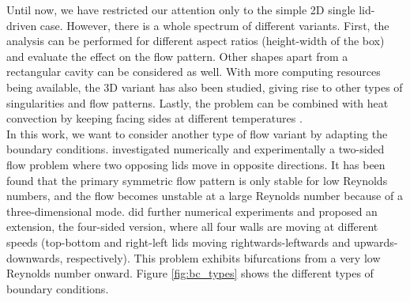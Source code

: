 Until now, we have restricted our attention only to the simple 2D single
lid-driven case. However, there is a whole spectrum of different variants.
First, the analysis can be performed for different aspect ratios (height-width
of the box) and evaluate the effect on the flow pattern. Other shapes apart
from a rectangular cavity can be considered as well. With more computing
resources being available, the 3D variant has also been studied, giving rise to
other types of singularities and flow patterns. Lastly, the problem can be
combined with heat convection by keeping facing sides at different
temperatures \citep{}. \\

In this work, we want to consider another type of flow variant by adapting the
boundary conditions. \cite{kuhlmann1997} investigated numerically and
experimentally a two-sided flow problem where two opposing lids move in
opposite directions. It has been found that the primary symmetric flow pattern
is only stable for low Reynolds numbers, and the flow becomes unstable at a large
Reynolds number because of a three-dimensional mode. \citep{wahba2009} did
further numerical experiments and proposed an extension, the four-sided
version, where all four walls are moving at different speeds (top-bottom and
right-left lids moving rightwards-leftwards and upwards-downwards,
respectively). This problem exhibits bifurcations from a very low Reynolds number
onward. Figure \ref{fig:bc_types} shows the different types of boundary
conditions.

